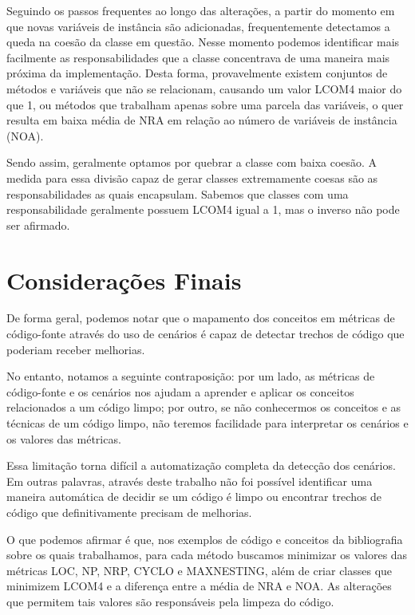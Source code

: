 Seguindo os passos frequentes ao longo das alterações, a partir do momento em que novas variáveis de instância
são adicionadas, frequentemente detectamos a queda na coesão da classe em questão. Nesse momento podemos identificar
mais facilmente as responsabilidades que a classe concentrava de uma maneira mais próxima da implementação.
Desta forma, provavelmente existem conjuntos de métodos e variáveis que não se relacionam, causando um valor LCOM4
maior do que 1, ou métodos que trabalham apenas sobre uma parcela das variáveis, o quer resulta em baixa média de
NRA em relação ao número de variáveis de instância (NOA).

Sendo assim, geralmente optamos por quebrar a classe com baixa coesão. A medida para essa divisão capaz de
gerar classes extremamente coesas são as responsabilidades as quais encapsulam. Sabemos que classes com uma
responsabilidade geralmente possuem LCOM4 igual a 1, mas o inverso não pode ser afirmado.

\section{Considerações Finais}
De forma geral, podemos notar que o mapamento dos conceitos em métricas de código-fonte através do uso
de cenários é capaz de detectar trechos de código que poderiam receber melhorias. 

No entanto, notamos a seguinte contraposição: por um lado, as métricas de código-fonte e os cenários nos
ajudam a aprender e aplicar os conceitos relacionados a um código limpo; por outro, se não conhecermos os
conceitos e as técnicas de um código limpo, não teremos facilidade para interpretar os cenários e os valores
das métricas.

Essa limitação torna difícil a automatização completa da detecção dos cenários. Em outras palavras,
através deste trabalho não foi possível identificar uma maneira automática de decidir se um código é limpo ou
encontrar trechos de código que definitivamente precisam de melhorias.

O que podemos afirmar é que, nos exemplos de código e conceitos da bibliografia sobre os quais trabalhamos,
para cada método buscamos minimizar os valores das métricas LOC, NP, NRP, CYCLO e MAXNESTING, além de criar
classes que minimizem LCOM4 e a diferença entre a média de NRA e NOA. As alterações que permitem tais valores
são responsáveis pela limpeza do código.


